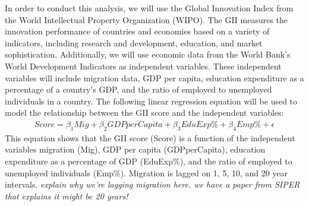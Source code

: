 \documentclass[12pt]{article}
\newcommand{\pointer}[1]{{\color{red} \center \textit{#1}}}
\begin{document}
In order to conduct this analysis, we will use the Global Innovation Index from the World Intellectual Property Organization (WIPO).
The GII measures the innovation performance of countries and economies based on a variety of indicators, including research and development, education, and market sophistication.
Additionally, we will use economic data from the World Bank's World Development Indicators as independent variables.
These independent variables will include migration data, GDP per capita, education expenditure as a percentage of a country's GDP, and the ratio of employed to unemployed individuals in a country.
The following linear regression equation will be used to model the relationship between the GII score and the independent variables:
\begin{align*}
     {Score} = \beta_{1}Mig + \beta_{2}{GDPperCapita} + \beta_{3}{EduExp\%} + \beta_{4}{Emp\%} + \epsilon
\end{align*}
This equation shows that the GII score (Score) is a function of the independent variables migration (Mig), GDP per capita (GDPperCapita), education expenditure as a percentage of GDP (EduExp\%), and the ratio of employed to unemployed individuals (Emp\%). Migration is lagged on 1, 5, 10, and 20 year intervals. \pointer{explain why we're lagging migration here. we have a paper from SIPER that explains it might be 20 years!}

\printbibliography
\end{document}
